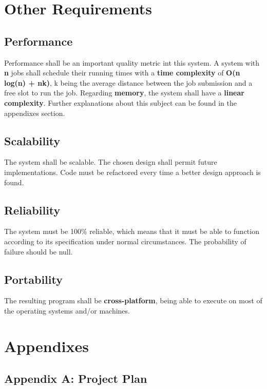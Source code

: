 \documentclass{scrreprt}
\begin{document}
\chapter{Other Requirements}

\section{Performance}

Performance shall be an important quality metric int this system. A system with \textbf{n} jobs shall schedule their running times with a \textbf{time complexity} of \textbf{O(n log(n) + nk)}, k being the average distance between the job submission and a free slot to run the job. Regarding \textbf{memory}, the system shall have a \textbf{linear complexity}. Further explanations about this subject can be found in the appendixes section.

\section{Scalability}
The system shall be scalable. The chosen design shall permit future implementations. Code must be refactored every time a better design approach is found.

\section{Reliability}

The system must be 100\% reliable, which means that it must be able to function according to its specification under normal circumstances. The probability of failure should be null.

\section{Portability}

The resulting program shall be \textbf{cross-platform}, being able to execute on most of the operating systems and/or machines.

\chapter{Appendixes}

\section{Appendix A: Project Plan}
\end{document}
